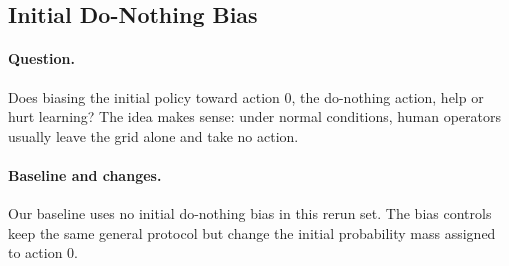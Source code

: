 
\begin{table}[H]
  \centering
  \small
  \caption{MLP baseline core rerun  summary.}
  \label{tab:a0-core-summary}
\end{table}

\subsection{Initial Do-Nothing Bias}
\label{subsec:a0-bias-reruns}

\paragraph{Question.}
Does biasing the initial policy toward action 0, the do-nothing action, help or
hurt learning? The idea makes sense: under normal conditions, human operators
usually leave the grid alone and take no action.

\paragraph{Baseline and changes.}
Our baseline uses no initial do-nothing bias in this rerun set. The bias
controls keep the same general protocol but change the initial probability mass
assigned to action 0.



